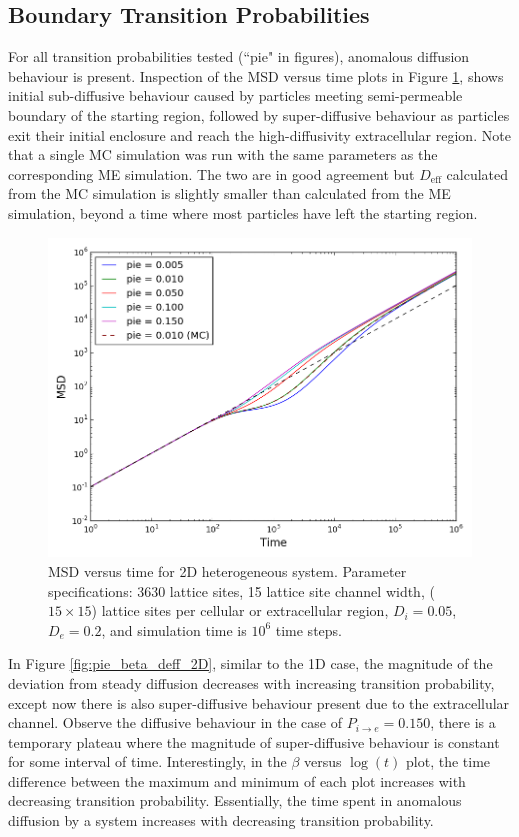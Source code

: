 \newpage
\subsection{Boundary Transition Probabilities}
\label{sec:2D-boundary-transition-probabilities}

	For all transition probabilities tested (``pie" in figures), anomalous diffusion behaviour is present. Inspection of the MSD versus time plots in Figure \ref{fig:pie_msd_2D}, shows initial sub-diffusive behaviour caused by particles meeting semi-permeable boundary of the starting region, followed by super-diffusive behaviour as particles exit their initial enclosure and reach the high-diffusivity extracellular region.  Note that a single MC simulation was run with the same parameters as the corresponding ME simulation. The two are in good agreement but $ D_\textrm{eff} $ calculated from the MC simulation is slightly smaller than calculated from the ME simulation, beyond a time where most particles have left the starting region.
	
	\begin{figure}[h!]
		\centering
		\includegraphics[width=1.0\linewidth]{../images/2D/pie_msd_2D}
		\caption{MSD versus time for 2D heterogeneous system. Parameter specifications: 3630 lattice sites, 15 lattice site channel width, ($ 15 \times 15 $) lattice sites per cellular or extracellular region, $ D_i = 0.05 $, $ D_e = 0.2 $, and simulation time is $ 10^6 $ time steps.}
		\label{fig:pie_msd_2D}
	\end{figure}
	
	In Figure \ref{fig:pie_beta_deff_2D}, similar to the 1D case, the magnitude of the deviation from steady diffusion decreases with increasing transition probability, except now there is also super-diffusive behaviour present due to the extracellular channel. Observe the diffusive behaviour in the case of $ P_{i \rightarrow e}  = 0.150 $, there is a temporary plateau where the magnitude of super-diffusive behaviour is constant for some interval of time. Interestingly, in the $ \beta $ versus $ \log(t) $ plot, the time difference between the maximum and minimum of each plot increases with decreasing transition probability. Essentially, the time spent in anomalous diffusion by a system increases with decreasing transition probability.
	
